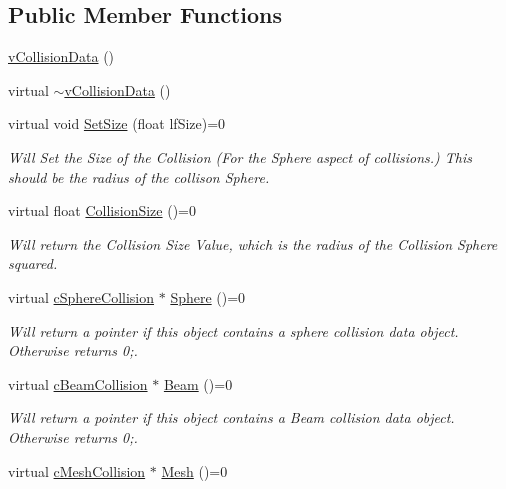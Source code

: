 \subsection*{Public Member Functions}
\begin{DoxyCompactItemize}
\item 
\hyperlink{classv_collision_data_a8c98f1f3dafb23fcb3890c201631920d}{vCollisionData} ()
\item 
virtual \hyperlink{classv_collision_data_a979fc9d68ba1ea6e76f64db9c8491f3f}{$\sim$vCollisionData} ()
\item 
virtual void \hyperlink{classv_collision_data_a00a42430617c673f7716e1b543020dd3}{SetSize} (float lfSize)=0
\begin{DoxyCompactList}\small\item\em Will Set the Size of the Collision (For the Sphere aspect of collisions.) This should be the radius of the collison Sphere. \item\end{DoxyCompactList}\item 
virtual float \hyperlink{classv_collision_data_a294ee887b1da0cfd16c0f3ce22f3e42d}{CollisionSize} ()=0
\begin{DoxyCompactList}\small\item\em Will return the Collision Size Value, which is the radius of the Collision Sphere squared. \item\end{DoxyCompactList}\item 
virtual \hyperlink{classc_sphere_collision}{cSphereCollision} $\ast$ \hyperlink{classv_collision_data_abdd66f6f80f7af9925923add7069efb0}{Sphere} ()=0
\begin{DoxyCompactList}\small\item\em Will return a pointer if this object contains a sphere collision data object. Otherwise returns 0;. \item\end{DoxyCompactList}\item 
virtual \hyperlink{classc_beam_collision}{cBeamCollision} $\ast$ \hyperlink{classv_collision_data_a8ecc16b27147cb9105b70c3e4eec80e9}{Beam} ()=0
\begin{DoxyCompactList}\small\item\em Will return a pointer if this object contains a Beam collision data object. Otherwise returns 0;. \item\end{DoxyCompactList}\item 
virtual \hyperlink{classc_mesh_collision}{cMeshCollision} $\ast$ \hyperlink{classv_collision_data_aa43965b2b0039ca5cb3398af7ae6dfd9}{Mesh} ()=0

\end{DoxyCompactItemize}

